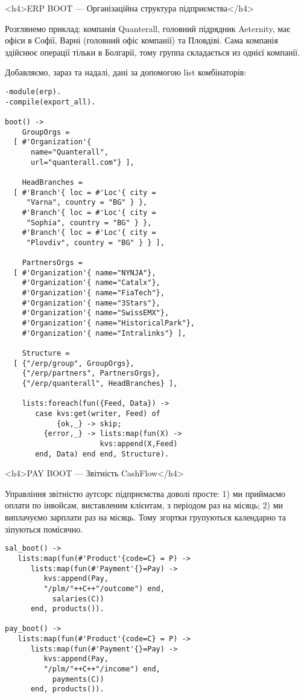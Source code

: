         <h4>ERP BOOT — Організаційна структура підприємства</h4>

        Розглянемо приклад: компанія Quanterall, головний підрядник Aeternity, має офіси в
           Софії, Варні (головний офіс компанії) та Пловдіві. Сама компанія здійснює операції
           тільки в Болгарії, тому группа складається из однієї компанії.

        Добавляємо, зараз та надалі, дані за допомогою list комбінаторів:

   \begin{lstlisting}
-module(erp).
-compile(export_all).

boot() ->
    GroupOrgs =
  [ #'Organization'{
      name="Quanterall",
      url="quanterall.com"} ],

    HeadBranches =
  [ #'Branch'{ loc = #'Loc'{ city =
     "Varna", country = "BG" } },
    #'Branch'{ loc = #'Loc'{ city =
     "Sophia", country = "BG" } },
    #'Branch'{ loc = #'Loc'{ city =
     "Plovdiv", country = "BG" } } ],

    PartnersOrgs =
  [ #'Organization'{ name="NYNJA"},
    #'Organization'{ name="Catalx"},
    #'Organization'{ name="FiaTech"},
    #'Organization'{ name="3Stars"},
    #'Organization'{ name="SwissEMX"},
    #'Organization'{ name="HistoricalPark"},
    #'Organization'{ name="Intralinks"} ],

    Structure =
  [ {"/erp/group", GroupOrgs},
    {"/erp/partners", PartnersOrgs},
    {"/erp/quanterall", HeadBranches} ],

    lists:foreach(fun({Feed, Data}) ->
       case kvs:get(writer, Feed) of
            {ok,_} -> skip;
         {error,_} -> lists:map(fun(X) ->
                      kvs:append(X,Feed)
       end, Data) end end, Structure).
    \end{lstlisting}

        <h4>PAY BOOT — Звітність CashFlow</h4>

        Управління звітністю аутсорс підприємства доволі просте:
           1) ми приймаємо оплати по інвойсам, виставленим клієнтам, з періодом раз на місяць;
           2) ми виплачуємо зарплати раз на місяць. Тому згортки групуються календарно
           та зіпуються помісячно.

   \begin{lstlisting}
sal_boot() ->
   lists:map(fun(#'Product'{code=C} = P) ->
      lists:map(fun(#'Payment'{}=Pay) ->
         kvs:append(Pay,
         "/plm/"++C++"/outcome") end,
           salaries(C))
      end, products()).

pay_boot() ->
   lists:map(fun(#'Product'{code=C} = P) ->
      lists:map(fun(#'Payment'{}=Pay) ->
         kvs:append(Pay,
         "/plm/"++C++"/income") end,
           payments(C))
      end, products()).
    \end{lstlisting}

